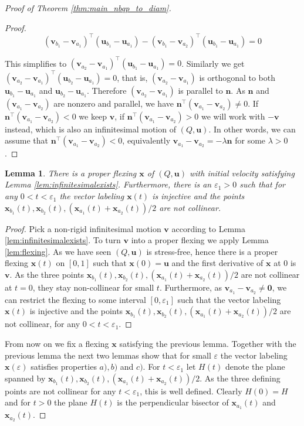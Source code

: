 \documentclass{article}
\newtheorem{lemma}[theorem]{Lemma}
\newcommand{\vu}[0]{\mathbf{u}}
\newcommand{\vv}[0]{\mathbf{v}}
\newcommand{\vn}[0]{\mathbf{n}}
\newcommand{\vx}[0]{\mathbf{x}}
\begin{document}
\begin{proof}[Proof of Theorem \ref{thm:main_nbqp_to_diam}]
\begin{proof}
        $$(\vv_{b_1}-\vv_{a_1})^\top(\vu_{b_1}-\vu_{a_1})-(\vv_{b_1}-\vv_{a_2})^\top(\vu_{b_1}-\vu_{a_1})=0$$

        This simplifies to $(\vv_{a_2}-\vv_{a_1})^\top(\vu_{b_1}-\vu_{a_1})=0$. Similarly we get $(\vv_{a_2}-\vv_{a_1})^\top(\vu_{b_2}-\vu_{a_1})=0$, that is, $(\vv_{a_2}-\vv_{a_1})$ is orthogonal to both  $\vu_{b_1}-\vu_{a_1}$ and $\vu_{b_2}-\vu_{a_1}$. Therefore $(\vv_{a_2}-\vv_{a_1})$ is parallel to $\vn$. As $\vn$ and $(\vv_{a_1}-\vv_{a_2})$ are nonzero and parallel, we have $\vn^\top (\vv_{a_1}-\vv_{a_2})\ne 0$. If $\vn^\top (\vv_{a_1}-\vv_{a_2})<0$ we keep $\vv$, if $\vn^\top (\vv_{a_1}-\vv_{a_2})>0$ we will work with $-\vv$ instead, which is also an infinitesimal motion of $(Q,\vu)$. In other words, we can assume that  $\vn^\top (\vv_{a_1}-\vv_{a_2})<0$,  equivalently $\vv_{a_1}-\vv_{a_2}=-\lambda\vn$ for some $\lambda>0$.
      \end{proof}
   
    
    
    \begin{lemma}\label{lem:injective}
        There is a proper flexing $\vx$ of $(Q,\vu)$ with initial velocity satisfying Lemma \ref{lem:infinitesimalexists}. Furthermore, there is an $\varepsilon_1>0$ such that for any $0<t<\varepsilon_1$ the vector labeling $\vx(t)$ is injective and the points $\vx_{b_1}(t),\vx_{b_2}(t),(\vx_{a_1}(t)+\vx_{a_2}(t))/2$ are not collinear.
    \end{lemma}
    \begin{proof}
    Pick a non-rigid infinitesimal motion $\vv$ according to Lemma \ref{lem:infinitesimalexists}. To turn $\vv$ into a proper flexing we apply Lemma \ref{lem:flexing}. As we have seen $(Q,\vu)$ is stress-free, hence  there is a proper flexing $\vx(t)$ on  $[0,1]$ such that $\vx(0)=\vu$ and the first derivative of $\vx$ at $0$ is $\vv$. As the three points $\vx_{b_1}(t),\vx_{b_2}(t),(\vx_{a_1}(t)+\vx_{a_2}(t))/2$ are not collinear at $t=0$, they stay non-collinear for small $t$. Furthermore, as $\vv_{a_1}-\vv_{a_2}\neq \mathbf{0}$, we can restrict the flexing to some interval $[0,\varepsilon_1]$ such that the vector labeling $\vx(t)$ is injective and the points $\vx_{b_1}(t),\vx_{b_2}(t),(\vx_{a_1}(t)+\vx_{a_2}(t))/2$ are not collinear, for any $0<t<\varepsilon_1$. 
        
    \end{proof}
    From now on we fix a flexing $\vx$ satisfying the previous lemma. Together with the previous lemma the next two lemmas show that for small $\varepsilon$ the vector labeling $\vx(\varepsilon)$ satisfies properties $a),b)$ and $c)$. For $t<\varepsilon_1$ let $H(t)$ denote the plane spanned by $\vx_{b_1}(t),\vx_{b_2}(t),(\vx_{a_1}(t)+\vx_{a_2}(t))/2$. As the three defining points are not collinear for any $t<\varepsilon_1$, this is well defined. Clearly $H(0)=H$ and for $t>0$ the plane $H(t)$ is the perpendicular bisector of  $\vx_{a_1}(t)$ and $\vx_{a_2}(t)$. 


\end{proof}
\end{document}
